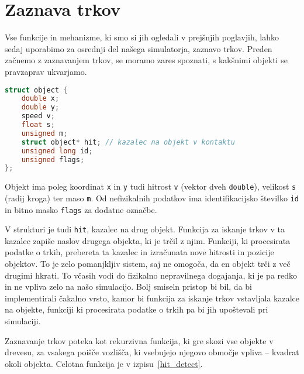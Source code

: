 \documentclass[a4paper,12pt]{article}
\begin{document}
\section{Zaznava trkov}
Vse funkcije in mehanizme, ki smo si jih ogledali v prejšnjih poglavjih, lahko sedaj uporabimo
za osrednji del našega simulatorja, zaznavo trkov.
Preden začnemo z zaznavanjem trkov, se moramo zares spoznati, s kakšnimi objekti se pravzaprav ukvarjamo.
\begin{lstlisting}[caption={Struktura objekta}, label=object_struct, language=C]
struct object {
    double x;
    double y;
    speed v;
    float s;
    unsigned m;
    struct object* hit; // kazalec na objekt v kontaktu
    unsigned long id;
    unsigned flags;
};
\end{lstlisting}
Objekt ima poleg koordinat \lstinline|x| in \lstinline|y| tudi hitrost \lstinline|v| (vektor dveh \lstinline|double|),
velikost \lstinline|s| (radij kroga) ter maso \lstinline|m|. Od nefizikalnih podatkov ima
identifikacijsko številko \lstinline|id| in bitno masko \lstinline|flags| za dodatne označbe.

V strukturi je tudi \lstinline|hit|, kazalec na drug objekt. Funkcija za iskanje trkov v ta kazalec zapiše naslov
drugega objekta, ki je trčil z njim. Funkciji, ki procesirata podatke o trkih, prebereta
ta kazalec in izračunata nove hitrosti in pozicije objektov. To je zelo pomanjkljiv sistem, saj ne omogoča,
da en objekt trči z več drugimi hkrati. To včasih vodi do fizikalno nepravilnega dogajanja, ki je pa redko
in ne vpliva zelo na našo simulacijo. Bolj smiseln pristop bi bil, da bi implementirali čakalno vrsto, kamor
bi funkcija za iskanje trkov vstavljala kazalce na objekte, funkciji ki procesirata podatke o trkih pa bi jih
upoštevali pri simulaciji.

Zaznavanje trkov poteka kot rekurzivna funkcija, ki gre skozi vse objekte v drevesu, za vsakega poišče vozlišča,
ki vsebujejo njegovo območje vpliva -- kvadrat okoli objekta. Celotna funkcija je v izpisu~\ref{hit_detect}.
\end{document}
